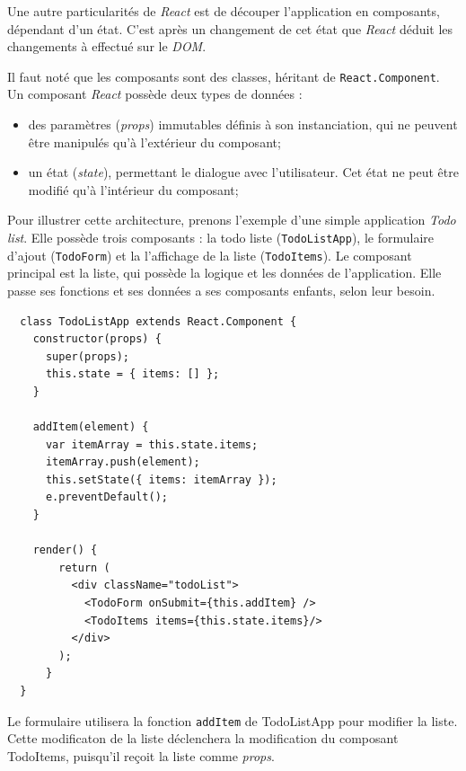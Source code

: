 \documentclass[12pt,a4paper]{article}
\providecommand{\tightlist}{%
  \setlength{\itemsep}{0pt}\setlength{\parskip}{0pt}}
\begin{document}
  \bigskip

  Une autre particularités de \emph{React} est de découper l'application
  en composants, dépendant d'un état. C'est après un changement de cet
  état que \emph{React} déduit les changements à effectué sur le
  \emph{DOM}.

  \bigskip

  Il faut noté que les composants sont des classes, héritant de
  \texttt{React.Component}. Un composant \emph{React} possède deux types
  de données :

  \begin{itemize}
  \tightlist
  \item
    des paramètres (\emph{props}) immutables définis à son instanciation,
    qui ne peuvent être manipulés qu'à l'extérieur du composant;
  \item
    un état (\emph{state}), permettant le dialogue avec l'utilisateur. Cet
    état ne peut être modifié qu'à l'intérieur du composant;
  \end{itemize}

  \bigskip

  Pour illustrer cette architecture, prenons l'exemple d'une simple
  application \emph{Todo list}. Elle possède trois composants : la todo
  liste (\texttt{TodoListApp}), le formulaire d'ajout (\texttt{TodoForm})
  et la l'affichage de la liste (\texttt{TodoItems}). Le composant
  principal est la liste, qui possède la logique et les données de
  l'application. Elle passe ses fonctions et ses données a ses composants
  enfants, selon leur besoin.

  \begin{verbatim}
  class TodoListApp extends React.Component {
    constructor(props) {
      super(props);
      this.state = { items: [] };
    }

    addItem(element) {
      var itemArray = this.state.items;
      itemArray.push(element);
      this.setState({ items: itemArray });
      e.preventDefault();
    }

    render() {
        return (
          <div className="todoList">
            <TodoForm onSubmit={this.addItem} />
            <TodoItems items={this.state.items}/>
          </div>
        );
      }
  }
  \end{verbatim}

  Le formulaire utilisera la fonction \texttt{addItem} de TodoListApp pour
  modifier la liste. Cette modificaton de la liste déclenchera la
  modification du composant TodoItems, puisqu'il reçoit la liste comme
  \emph{props}.
\end{document}
